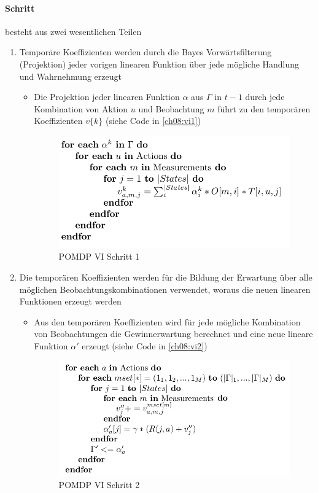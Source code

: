 \paragraph{Schritt} besteht aus zwei wesentlichen Teilen
\begin{enumerate}
	\item Tempor\"are Koeffizienten werden durch die Bayes Vorw\"artsfilterung (Projektion) jeder vorigen linearen Funktion \"uber jede m\"ogliche Handlung und Wahrnehmung erzeugt
	\begin{itemize}
		\item Die Projektion jeder linearen Funktion $\alpha$ aus $\Gamma$ in $t-1$ durch jede Kombination von Aktion $u$ und Beobachtung $m$ f\"uhrt zu den tempor\"aren Koeffizienten $v\{ k \}$ (siehe Code in \autoref{ch08:vi1})
		\begin{figure}[!h]
			\centering
  			\includegraphics[width=0.4\linewidth]{figures/ch08_vi1.png}
  			\centering
			\caption{POMDP VI Schritt 1}
			\label{ch08:vi1}
		\end{figure}
	\end{itemize}
	\item Die tempor\"aren Koeffizienten werden f\"ur die Bildung der Erwartung \"uber alle m\"oglichen Beobachtungskombinationen verwendet, woraus die neuen linearen Funktionen erzeugt werden
	\begin{itemize}
		\item Aus den tempor\"aren Koeffizienten wird f\"ur jede m\"ogliche Kombination von Beobachtungen die Gewinnerwartung berechnet und eine neue lineare Funktion $\alpha'$ erzeugt (siehe Code in \autoref{ch08:vi2})
		\begin{figure}[!h]
			\centering
  			\includegraphics[width=0.4\linewidth]{figures/ch08_vi2.png}
  			\centering
			\caption{POMDP VI Schritt 2}
			\label{ch08:vi2}
		\end{figure}
	\end{itemize}
\end{enumerate}

